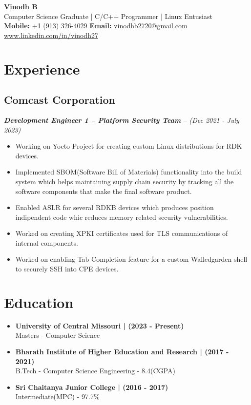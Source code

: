 \documentclass[10pt,a5paper]{article}
\renewcommand{\maketitle}[5]{
	\begin{center}
	\huge{\bfseries{#1}} \\
	\vspace*{0.25em}
	\large{#2} \\
	\vspace*{0.25em}
	\textbf{Mobile:} {#3} \hspace*{0.5em}
	\textbf{Email:} {#4} \hspace*{0.5em}
	\url{#5}
	\end{center}
}
\begin{document}
\maketitle
{Vinodh B}
{Computer Science Graduate | C/C++ Programmer | Linux Entusiast}
{+1 (913) 326-4029}
{vinodhb2720@gmail.com}
{www.linkedin.com/in/vinodh27}

\thispagestyle{empty}

\section{Experience}
\subsection{Comcast Corporation}
\hspace*{0.25em}\textit{\textbf{Development Engineer 1 -- Platform Security Team} -- (Dec 2021 - July 2023)}
\begin{itemize}[leftmargin=6mm]
	\setlength\itemsep{0em}
	\item{Working on Yocto Project for creating custom Linux distributions for RDK devices.}
	\item{Implemented SBOM(Software Bill of Materials) functionality into the build system which helps maintaining supply chain security by tracking all the software components that make the final software product.}
	\item{Enabled ASLR for several RDKB devices which produces position indipendent code whic reduces memory related security vulnerabilities.}
	\item{Worked on creating XPKI certificates used for TLS communications of internal components.}
	\item{Worked on enabling Tab Completion feature for a custom Walledgarden shell to securely SSH into CPE devices.}
\end{itemize}

\section{Education}
\begin{itemize}[leftmargin=3mm]
	\setlength\itemsep{0em}
\item{
	\textbf{University of Central Missouri | (2023 {-} Present)} \\
	Masters {-} Computer Science
}
\item {
	\textbf{Bharath Institute of Higher Education and Research | (2017 {-} 2021)} \\
	B.Tech {-} Computer Science Engineering {-} 8.4(CGPA)
}
\item {
	\textbf{Sri Chaitanya Junior College | (2016 {-} 2017)} \\
	Intermediate(MPC) {-} 97.7\%
}
\end{itemize}
\end{document}
